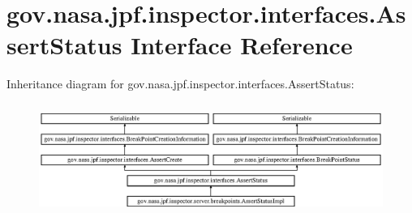 \hypertarget{interfacegov_1_1nasa_1_1jpf_1_1inspector_1_1interfaces_1_1_assert_status}{}\section{gov.\+nasa.\+jpf.\+inspector.\+interfaces.\+Assert\+Status Interface Reference}
\label{interfacegov_1_1nasa_1_1jpf_1_1inspector_1_1interfaces_1_1_assert_status}
Inheritance diagram for gov.\+nasa.\+jpf.\+inspector.\+interfaces.\+Assert\+Status\+:\begin{figure}[H]
\begin{center}
\leavevmode
\includegraphics[height=3.674541cm]{interfacegov_1_1nasa_1_1jpf_1_1inspector_1_1interfaces_1_1_assert_status}
\end{center}
\end{figure}

